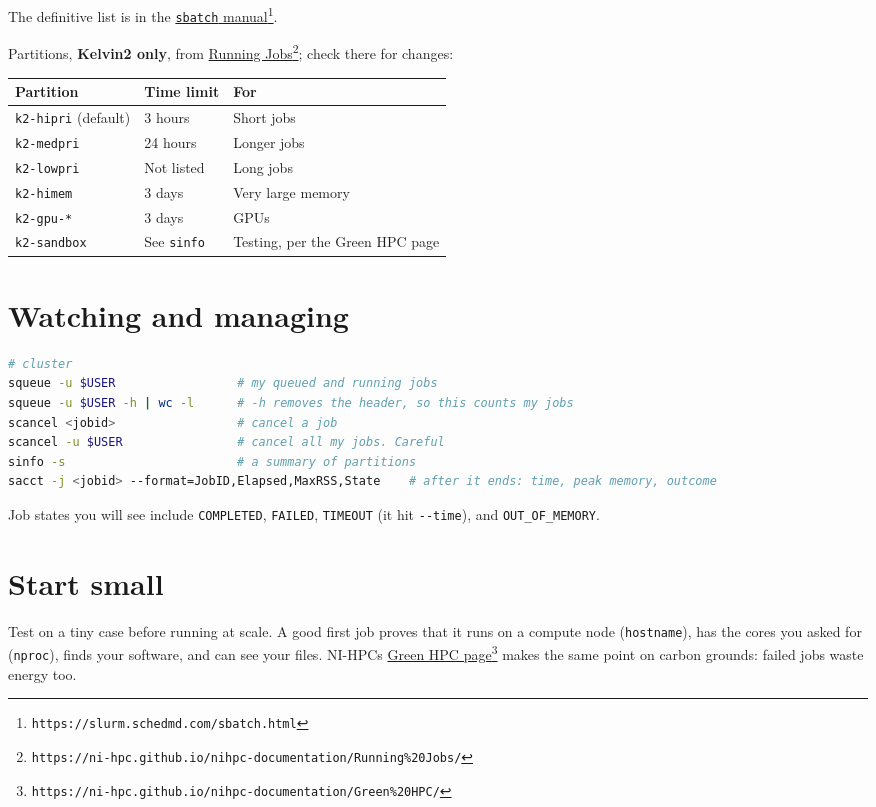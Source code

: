 The definitive list is in the \href{https://slurm.schedmd.com/sbatch.html}{\texttt{sbatch} manual}\footnote{\texttt{https://slurm.schedmd.com/sbatch.html}}.

Partitions, \textbf{Kelvin2 only}, from \href{https://ni-hpc.github.io/nihpc-documentation/Running\%20Jobs/}{Running Jobs}\footnote{\texttt{https://ni-hpc.github.io/nihpc-documentation/Running\%20Jobs/}}; check there for changes:

{\def\LTcaptype{none} %
\begin{longtable}[]{@{}lll@{}}
\toprule\noalign{}
Partition & Time limit & For \\
\midrule\noalign{}
\endhead
\bottomrule\noalign{}
\endlastfoot
\texttt{k2-hipri} (default) & 3 hours & Short jobs \\
\texttt{k2-medpri} & 24 hours & Longer jobs \\
\texttt{k2-lowpri} & Not listed & Long jobs \\
\texttt{k2-himem} & 3 days & Very large memory \\
\texttt{k2-gpu-*} & 3 days & GPUs \\
\texttt{k2-sandbox} & See \texttt{sinfo} & Testing, per the Green HPC page \\
\end{longtable}
}

\section{Watching and managing}\label{watching-and-managing}

\begin{lstlisting}[language=bash]
# cluster
squeue -u $USER                 # my queued and running jobs
squeue -u $USER -h | wc -l      # -h removes the header, so this counts my jobs
scancel <jobid>                 # cancel a job
scancel -u $USER                # cancel all my jobs. Careful
sinfo -s                        # a summary of partitions
sacct -j <jobid> --format=JobID,Elapsed,MaxRSS,State    # after it ends: time, peak memory, outcome
\end{lstlisting}

Job states you will see include \texttt{COMPLETED}, \texttt{FAILED}, \texttt{TIMEOUT} (it hit \texttt{-\/-time}), and \texttt{OUT\_OF\_MEMORY}.

\section{Start small}\label{start-small}

Test on a tiny case before running at scale. A good first job proves that it runs on a compute node (\texttt{hostname}), has the cores you asked for (\texttt{nproc}), finds your software, and can see your files. NI-HPC\textquotesingle s \href{https://ni-hpc.github.io/nihpc-documentation/Green\%20HPC/}{Green HPC page}\footnote{\texttt{https://ni-hpc.github.io/nihpc-documentation/Green\%20HPC/}} makes the same point on carbon grounds: failed jobs waste energy too.

